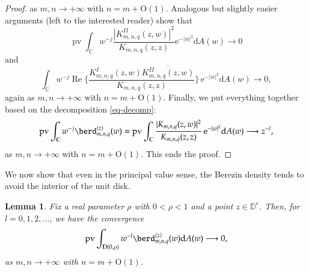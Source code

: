 \documentclass{birkart}
\newtheorem{lem}[thm]{Lemma}
\theoremstyle{definition}
\theoremstyle{remark}
\numberwithin{equation}{section}
\numberwithin{figure}{section}
\newcommand{\e}{\mathrm e}
\newcommand{\1}{{\mathbf 1}}
\newcommand{\Rpar}{q}
\newcommand{\C}{{\mathbb C}}
\newcommand{\D}{{\mathbb D}}
\newcommand{\Ordo}{\mathrm{O}}
\newcommand{\re}{\operatorname{Re}}
\newcommand{\diff}{{\mathrm d}}
\newcommand{\pv}{\operatorname{\mathrm{pv}}}
\begin{document}
\begin{proof}
as $m,n\to+\infty$ with $n=m+\Ordo(1)$. 
Analogous but slightly easier arguments (left to the interested reader) 
show that 
\begin{equation*}
\pv 
\int_{\mathbb{C}}w^{-j}\frac{|K^{II}_{m,n,\Rpar}(z,w)|^2}{K_{m,n,q}(z,z)} 
\e^{-|w|^2}\diff A(w) \longrightarrow 0 
\end{equation*}
and
\[
\int_{\mathbb{C}}w^{-j}\re\Bigg\{\frac{K^{I}_{m,n,\Rpar}(z,w)
\overline{K^{II}_{m,n,\Rpar}(z,w)}}{K_{m,n,q}(z,z)}\Bigg\}
\,\e^{-|w|^2}\diff A(w) \longrightarrow 0,
\]
again as $m,n\to+\infty$ with $n=m+\Ordo(1)$.
Finally, we put everything together based on the decomposition 
\eqref{eq-decomp}:
\[
\pv\int_{\mathbb{C}}w^{-j}\berd^{\langle z\rangle}_{m,n,q}(w)=\pv\int_{\C}
\frac{|K_{m,n,\Rpar}(z,w)|^2}{K_{m,n,q}(z,z)}\,\e^{-|w|^2}\diff A(w) 
\longrightarrow z^{-l},
\]
as $m,n\to+\infty$ with $n=m+\Ordo(1)$. This ends the proof. 
\end{proof}
\medskip

We now show that even in the principal value sense, the Berezin density 
tends to avoid the interior of the unit disk.

\begin{lem}
Fix a real parameter $\rho$ with $0<\rho<1$ and a point $z\in\D^e$.
Then, for $l=0,1,2,\ldots$, we have the convergence 
\[ 
\pv \int_{\D(0,\rho)}w^{-l}\berd^{\langle z\rangle}_{m,n,\Rpar}(w)\diff A(w) 
\longrightarrow0, 
\]
as $m,n\to+\infty$ with $n=m+\Ordo(1)$. 
\end{lem}
\end{document}
